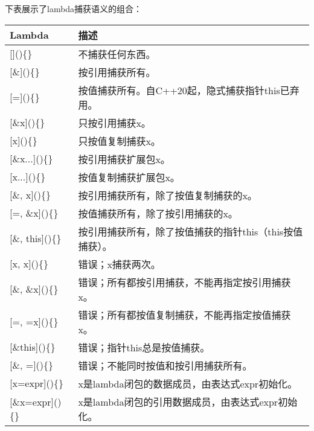 下表展示了lambda捕获语义的组合：

\begin{longtable}{|l|l|}
\hline
\textbf{Lambda}    & \textbf{描述}                                                                        \\ \hline
\endfirsthead
%
\endhead
%
{[}{]}()\{\}       & 不捕获任何东西。                                                                  \\ \hline
{[}\&{]}()\{\}     & 按引用捕获所有。                                                           \\ \hline
{[}={]}()\{\}      & 按值捕获所有。自C++20起，隐式捕获指针this已弃用。 \\ \hline
{[}\&x{]}()\{\}    &  只按引用捕获x。                                                    \\ \hline
{[}x{]}()\{\}      & 只按值复制捕获x。                                                                    \\ \hline
{[}\&x...{]}()\{\} & 按引用捕获扩展包x。                                                     \\ \hline
{[}x...{]}()\{\}   & 按值复制捕获扩展包x。                                                          \\ \hline
{[}\&, x{]}()\{\}  & 按引用捕获所有，除了按值复制捕获的x。                     \\ \hline
{[}=, \&x{]}()\{\} & 按值捕获所有，除了按引用捕获的x。                     \\ \hline
{[}\&, this{]}()\{\} & 按引用捕获所有，除了按值捕获的指针this（this按值捕获）。 \\ \hline
{[}x, x{]}()\{\}   & 错误；x捕获两次。                                                                 \\ \hline
{[}\&, \&x{]}()\{\}  & 错误；所有都按引用捕获，不能再指定按引用捕获x。                         \\ \hline
{[}=, =x{]}()\{\}  & 错误；所有都按值复制捕获，不能再指定按值捕获x。    \\ \hline
{[}\&this{]}()\{\} & 错误；指针this总是按值捕获。                                         \\ \hline
{[}\&, ={]}()\{\}  & 错误；不能同时按值和按引用捕获所有。                             \\ \hline
{[}x=expr{]}()\{\} & x是lambda闭包的数据成员，由表达式expr初始化。            \\ \hline
{[}\&x=expr{]}()\{\} & x是lambda闭包的引用数据成员，由表达式expr初始化。                                 \\ \hline
\end{longtable}


